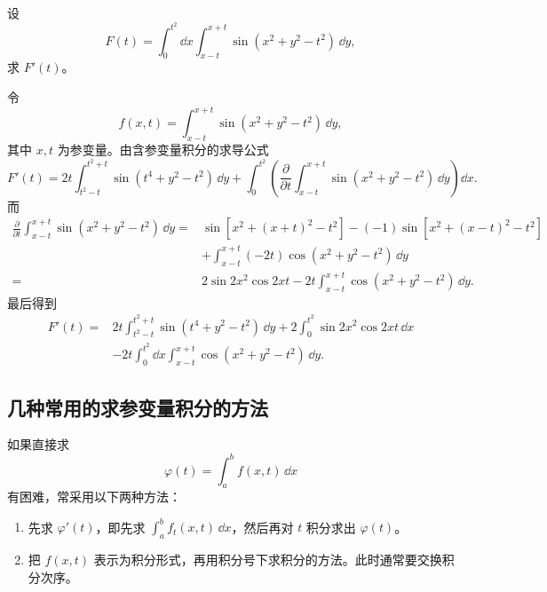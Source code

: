 \begin{xexample}[23.1.2]
设
\[
  F(t)=\int_0^{t^2}\dd x\int_{x-t}^{x+t}\sin(x^2+y^2-t^2)\,\dd y,
\]
求 $F'(t)$。
\end{xexample}
\begin{xsolution}
令
\[
  f(x,t)=\int_{x-t}^{x+t}\sin(x^2+y^2-t^2)\,\dd y,
\]
其中 $x,t$ 为参变量。由含参变量积分的求导公式
\[
  F'(t)=2t\int_{t^2-t}^{t^2+t}\sin(t^4+y^2-t^2)\,\dd y
  +\int_0^{t^2}\left(\frac{\partial}{\partial t}
  \int_{x-t}^{x+t}\sin(x^2+y^2-t^2)\,\dd y\right)\dd x.
\]
而
\[
\begin{aligned}
  \frac{\partial}{\partial t}\int_{x-t}^{x+t}\sin(x^2+y^2-t^2)\,\dd y
  ={}&\sin[x^2+(x+t)^2-t^2]-(-1)\sin[x^2+(x-t)^2-t^2]\\
  &+\int_{x-t}^{x+t}(-2t)\cos(x^2+y^2-t^2)\,\dd y\\
  ={}&2\sin2x^2\cos2xt-2t\int_{x-t}^{x+t}\cos(x^2+y^2-t^2)\,\dd y.
\end{aligned}
\]
最后得到
\[
\begin{aligned}
  F'(t)={}&2t\int_{t^2-t}^{t^2+t}\sin(t^4+y^2-t^2)\,\dd y
  +2\int_0^{t^2}\sin2x^2\cos2xt\,\dd x\\
  &-2t\int_0^{t^2}\dd x\int_{x-t}^{x+t}\cos(x^2+y^2-t^2)\,\dd y.
\end{aligned}
\]
\end{xsolution}

\subsection{几种常用的求参变量积分的方法}

如果直接求
\[
  \varphi(t)=\int_a^b f(x,t)\,\dd x
\]
有困难，常采用以下两种方法：
\begin{enumerate}
  \item 先求 $\varphi'(t)$，即先求 $\displaystyle\int_a^b f_t(x,t)\,\dd x$，然后再对 $t$ 积分求出 $\varphi(t)$。
  \item 把 $f(x,t)$ 表示为积分形式，再用积分号下求积分的方法。此时通常要交换积分次序。
\end{enumerate}

